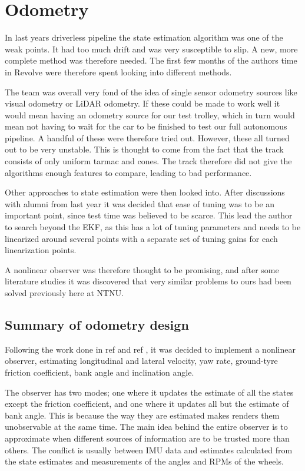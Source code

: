 \section{Odometry}

In last years driverless pipeline the state estimation algorithm was one of the weak points. It had too much drift and was very susceptible to slip. A new, more complete method was therefore needed. The first few months of the authors time in Revolve were therefore spent looking into different methods.

The team was overall very fond of the idea of single sensor odometry sources like visual odometry or LiDAR odometry. If these could be made to work well it would mean having an odometry source for our test trolley, which in turn would mean not having to wait for the car to be finished to test our full autonomous pipeline. A handful of these were therefore tried out. However, these all turned out to be very unstable. This is thought to come from the fact that the track consists of only uniform tarmac and cones. The track therefore did not give the algorithms enough features to compare, leading to bad performance.

Other approaches to state estimation were then looked into. After discussions with alumni from last year it was decided that ease of tuning was to be an important point, since test time was believed to be scarce. This lead the author to search beyond the EKF, as this has a lot of tuning parameters and needs to be linearized around several points with a separate set of tuning gains for each linearization points. 

A nonlinear observer was therefore thought to be promising, and after some literature studies it was discovered that very similar problems to ours had been solved previously here at NTNU. 

\subsection{Summary of odometry design}

Following the work done in ref \cite{Automatica08} and ref \cite{MainStateEst}, it was decided to implement a nonlinear observer, estimating longitudinal and lateral velocity, yaw rate, ground-tyre friction coefficient, bank angle and inclination angle.

The observer has two modes; one where it updates the estimate of all the states except the friction coefficient, and one where it updates all but the estimate of bank angle. This is because the way they are estimated makes renders them unobservable at the same time. 
The main idea behind the entire observer is to approximate when different sources of information are to be trusted more than others. The conflict is usually between \gls{IMU} data and estimates calculated from the state estimates and measurements of the angles and \glspl{RPM} of the wheels.

